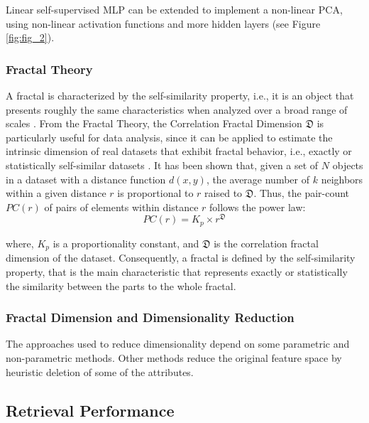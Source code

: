 \documentclass{article}
\begin{document}
Linear self-supervised MLP can be extended to implement a non-linear PCA, using non-linear activation functions and more hidden layers (see Figure \ref{fig:fig_2}).

     	
\subsubsection{Fractal Theory } %
 

A fractal is characterized by the self-similarity property, i.e., it is an object that presents roughly the same characteristics when analyzed over a broad range of scales \cite{DBLP:journals/jidm/TrainaTWF10}. From the Fractal Theory, the Correlation Fractal Dimension $\mathfrak{D}$ is particularly useful for data analysis, since it can be applied to estimate the intrinsic dimension of real datasets that exhibit fractal behavior, i.e., exactly or statistically self-similar datasets \cite{DBLP:fractal2016}.   It has been shown that, given a set of $N$ objects in a dataset with a distance function $d(x,y)$, the average number of $k$ neighbors within a given distance $r$ is proportional to $r$ raised to $\mathfrak{D}$. Thus, the pair-count $PC(r)$ of pairs of elements within distance $r$ follows the power law:
\begin{equation}\label{eq:fractal}
       PC(r) = K_p \times r^{\mathfrak{D}}
    \end{equation}

     where, $K_p$ is a proportionality constant, and $\mathfrak{D}$ is the correlation fractal dimension of the dataset.
    Consequently, a fractal is defined by the self-similarity property, that is the main characteristic that represents exactly or statistically  the similarity between the parts to the whole fractal.
 
\subsubsection{ Fractal Dimension and Dimensionality Reduction} %
 

The approaches used to reduce dimensionality depend on some parametric and non-parametric methods. Other methods reduce the original feature space by heuristic deletion of some of the attributes.


\subsection{Retrieval Performance} %
\end{document}
